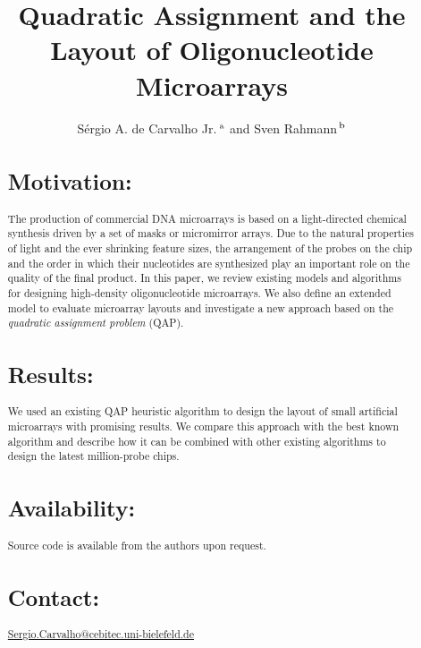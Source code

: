 \documentclass{bioinfo}
\begin{document}

\title[Quadratic assignment and microarrays]{Quadratic Assignment and the Layout of Oligonucleotide Microarrays}
\author[S.A.de Carvalho Jr. and S.Rahmann]{S\'ergio A. de Carvalho Jr.\,$^{\rm a}$ and Sven Rahmann\,$^{\rm b}$}
\address{$^{\rm a}$Graduiertenkolleg Bioinformatik, Bielefeld University, Germany,\\$^{\rm b}$Algorithms and Statistics for Systems Biology, Genome Informatics, Bielefeld University, Germany.}
\maketitle

\begin{abstract}

\section{Motivation:}
The production of commercial DNA microarrays is based on a light-directed chemical synthesis driven by a set of masks or micromirror arrays. Due to the natural properties of light and the ever shrinking feature sizes, the arrangement of the probes on the chip and the order in which their nucleotides are synthesized play an important role on the quality of the final product. In this paper, we review existing models and algorithms for designing high-density oligonucleotide microarrays. We also define an extended model to evaluate microarray layouts and investigate a new approach based on the \emph{quadratic assignment problem} (QAP).
\section{Results:}
We used an existing QAP heuristic algorithm to design the layout of small artificial microarrays with promising results. We compare this approach with the best known algorithm and describe how it can be combined with other existing algorithms to design the latest million-probe chips.
\section{Availability:}
Source code is available from the authors upon request.
\section{Contact:} \href{Sergio.Carvalho@cebitec.uni-bielefeld.de}{Sergio.Carvalho@cebitec.uni-bielefeld.de}
\end{abstract}
\end{document}
